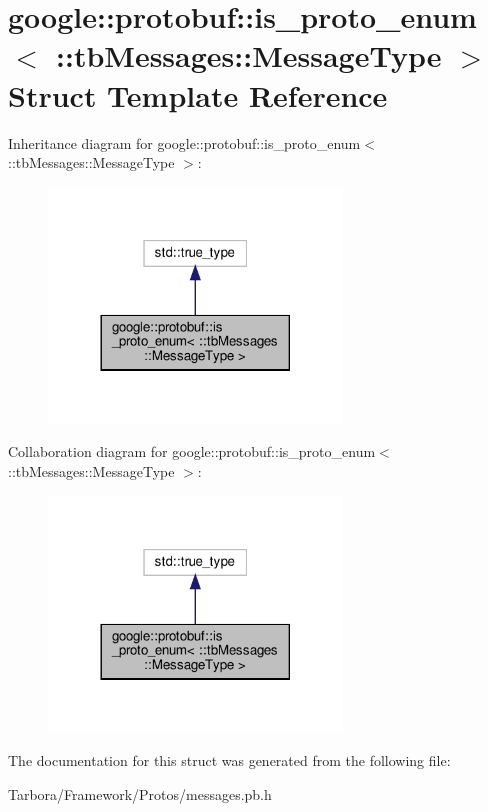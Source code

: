 \hypertarget{structgoogle_1_1protobuf_1_1is__proto__enum_3_01_1_1tbMessages_1_1MessageType_01_4}{}\section{google\+:\+:protobuf\+:\+:is\+\_\+proto\+\_\+enum$<$ \+:\+:tb\+Messages\+:\+:Message\+Type $>$ Struct Template Reference}
\label{structgoogle_1_1protobuf_1_1is__proto__enum_3_01_1_1tbMessages_1_1MessageType_01_4}


Inheritance diagram for google\+:\+:protobuf\+:\+:is\+\_\+proto\+\_\+enum$<$ \+:\+:tb\+Messages\+:\+:Message\+Type $>$\+:
\nopagebreak
\begin{figure}[H]
\begin{center}
\leavevmode
\includegraphics[width=221pt]{structgoogle_1_1protobuf_1_1is__proto__enum_3_01_1_1tbMessages_1_1MessageType_01_4__inherit__graph}
\end{center}
\end{figure}


Collaboration diagram for google\+:\+:protobuf\+:\+:is\+\_\+proto\+\_\+enum$<$ \+:\+:tb\+Messages\+:\+:Message\+Type $>$\+:
\nopagebreak
\begin{figure}[H]
\begin{center}
\leavevmode
\includegraphics[width=221pt]{structgoogle_1_1protobuf_1_1is__proto__enum_3_01_1_1tbMessages_1_1MessageType_01_4__coll__graph}
\end{center}
\end{figure}


The documentation for this struct was generated from the following file\+:\begin{DoxyCompactItemize}
\item 
Tarbora/\+Framework/\+Protos/messages.\+pb.\+h\end{DoxyCompactItemize}
